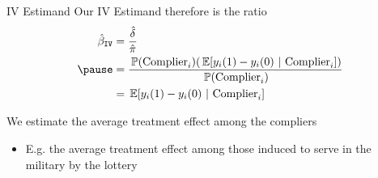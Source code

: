 \documentclass[aspectratio=169,t,11pt,table]{beamer}
\begin{document}
\begin{frame}{IV Estimand}
  Our IV Estimand therefore is the ratio 
  \begin{align*}
    \hat{\beta}_{\texttt{IV}} &= 
    \frac{\hat{\delta}}{\hat{\pi}} \\
    \pause
    &= \frac{\prob{\text{Complier}_i} (\expec{y_i(1) - y_i(0)}{\text{Complier}_i})}{\prob{\text{Complier}_i}} \\
    &= \expec{y_i(1) - y_i(0)}{\text{Complier}_i}
  \end{align*}

  \bigskip
  We estimate the average treatment effect among the compliers
  \begin{itemize}
    \item E.g. the average treatment effect among those induced to serve in the military by the lottery
  \end{itemize}

\end{frame}



\end{document}
